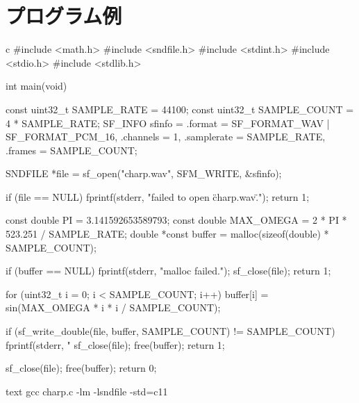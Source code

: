 \documentclass[../../main]{subfiles}
\begin{document}
\chapter{プログラム例}

\begin{codeblock}{c}
#include <math.h>
#include <sndfile.h>
#include <stdint.h>
#include <stdio.h>
#include <stdlib.h>

int main(void) {
  const uint32_t SAMPLE_RATE = 44100;
  const uint32_t SAMPLE_COUNT = 4 * SAMPLE_RATE;
  SF_INFO sfinfo = {.format = SF_FORMAT_WAV | SF_FORMAT_PCM_16,
                    .channels = 1,
                    .samplerate = SAMPLE_RATE,
                    .frames = SAMPLE_COUNT};

  SNDFILE *file = sf_open("charp.wav", SFM_WRITE, &sfinfo);

  if (file == NULL) {
    fprintf(stderr, "failed to open \"charp.wav\".\n");
    return 1;
  }

  const double PI = 3.141592653589793;
  const double MAX_OMEGA = 2 * PI * 523.251 / SAMPLE_RATE;
  double *const buffer = malloc(sizeof(double) * SAMPLE_COUNT);

  if (buffer == NULL) {
    fprintf(stderr, "malloc failed.\n");
    sf_close(file);
    return 1;
  }

  for (uint32_t i = 0; i < SAMPLE_COUNT; i++) {
    buffer[i] = sin(MAX_OMEGA * i * i / SAMPLE_COUNT);
  }

  if (sf_write_double(file, buffer, SAMPLE_COUNT) != SAMPLE_COUNT) {
    fprintf(stderr, "%
    sf_close(file);
    free(buffer);
    return 1;
  }

  sf_close(file);
  free(buffer);
  return 0;
}
\end{codeblock}

\begin{codeblock}{text}
gcc charp.c -lm -lsndfile -std=c11
\end{codeblock}
\end{document}
